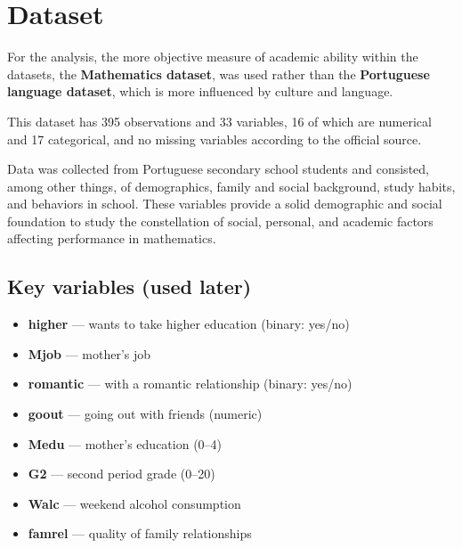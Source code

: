 \documentclass[9pt,twocolumn,twoside,]{pinp}
\providecommand{\tightlist}{%
  \setlength{\itemsep}{0pt}\setlength{\parskip}{0pt}}
\begin{document}
\section{Dataset}\label{dataset}

For the analysis, the more objective measure of academic ability within
the datasets, the \textbf{Mathematics dataset}, was used rather than the
\textbf{Portuguese language dataset}, which is more influenced by
culture and language.

This dataset has 395 observations and 33 variables, 16 of which are
numerical and 17 categorical, and no missing variables according to the
official source.

Data was collected from Portuguese secondary school students and
consisted, among other things, of demographics, family and social
background, study habits, and behaviors in school. These variables
provide a solid demographic and social foundation to study the
constellation of social, personal, and academic factors affecting
performance in mathematics.

\subsection{Key variables (used later)}\label{key-variables-used-later}

\begin{itemize}
\tightlist
\item
  \textbf{higher} --- wants to take higher education (binary: yes/no)\\
\item
  \textbf{Mjob} --- mother's job\\
\item
  \textbf{romantic} --- with a romantic relationship (binary: yes/no)\\
\item
  \textbf{goout} --- going out with friends (numeric)\\
\item
  \textbf{Medu} --- mother's education (0--4)\\
\item
  \textbf{G2} --- second period grade (0--20)\\
\item
  \textbf{Walc} --- weekend alcohol consumption\\
\item
  \textbf{famrel} --- quality of family relationships
\end{itemize}
\end{document}
